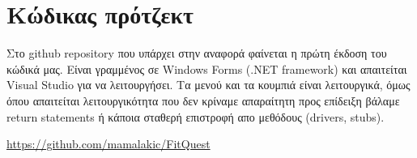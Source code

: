 \section{Κώδικας πρότζεκτ}

Στο github repository που υπάρχει στην αναφορά φαίνεται η πρώτη έκδοση του κώδικά μας. Είναι γραμμένος σε Windows Forms (.NET framework) και απαιτείται Visual Studio για να λειτουργήσει. Τα μενού και τα κουμπιά είναι λειτουργικά, όμως όπου απαιτείται λειτουργικότητα που δεν κρίναμε απαραίτητη προς επίδειξη βάλαμε return statements ή κάποια σταθερή επιστροφή απο μεθόδους (drivers, stubs).

\url{https://github.com/mamalakic/FitQuest}